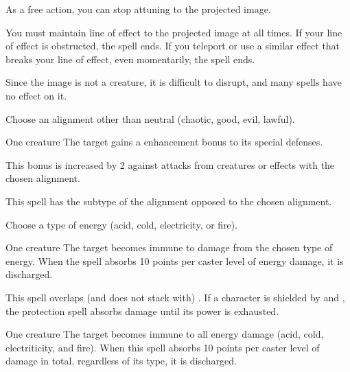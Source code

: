 As a free action, you can stop attuning to the projected image.

\spellnotes You must maintain line of effect to the projected image at all times. If your line of effect is obstructed, the spell ends. If you teleport or use a similar effect that breaks your line of effect, even momentarily, the spell ends.

Since the image is not a creature, it is difficult to disrupt, and many spells have no effect on it.

\spellrng{\rngclose}
\spelldur{\durshort \dismissable}
\spellspecial Choose an alignment other than neutral (chaotic, good, evil, lawful).
\begin{spelltarget}{One creature}
    \spelleffect The target gains a  enhancement bonus to its special defenses. \spellbonusscalingdescription

    This bonus is increased by 2 against attacks from creatures or effects with the chosen alignment.
\end{spelltarget}
\spellnotes This spell has the subtype of the alignment opposed to the chosen alignment.

\spellspecial Choose a type of energy (acid, cold, electricity, or fire).
\begin{spelltarget}{One creature}
    \spelleffect The target becomes immune to damage from the chosen type of energy. When the spell absorbs 10 points per caster level of energy damage, it is discharged.
\end{spelltarget}
\spellnotes This spell overlaps (and does not stack with) . If a character is shielded by  and , the protection spell absorbs damage until its power is exhausted.

\begin{spelltarget}{One creature}
    \spelleffect The target becomes immune to all energy damage (acid, cold, electriticity, and fire). When this spell absorbs 10 points per caster level of damage in total, regardless of its type, it is discharged.
\end{spelltarget}

